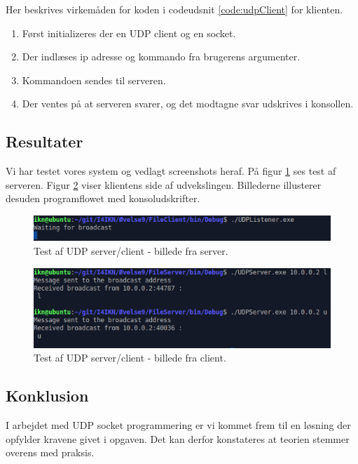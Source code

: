 Her beskrives virkemåden for koden i codeudsnit \ref{code:udpClient} for klienten.

\begin{enumerate}
	\item Først initializeres der en UDP client og en socket.
	\item Der indlæses ip adresse og kommando fra brugerens argumenter.
	\item Kommandoen sendes til serveren.
	\item Der ventes på at serveren svarer, og det modtagne svar udskrives i konsollen.
\end{enumerate}

\subsection{Resultater}
Vi har testet vores system og vedlagt screenshots heraf. På figur \ref{fig:udp_h1} ses test af serveren. Figur \ref{fig:udp_h2} viser klientens side af udvekslingen. Billederne illusterer desuden programflowet med konsoludskrifter.

\begin{figure}[H]
	\centering
	\includegraphics[width=0.9\linewidth]{figs/udp_h1}
	\caption{Test af UDP server/client - billede fra server.}
	\label{fig:udp_h1}
\end{figure}

\begin{figure}[H]
	\centering
	\includegraphics[width=0.9\linewidth]{figs/udp_h2}
	\caption{Test af UDP server/client - billede fra client.}
	\label{fig:udp_h2}
\end{figure}

\subsection{Konklusion}
I arbejdet med UDP socket programmering er vi kommet frem til en løsning der opfylder kravene givet i opgaven. Det kan derfor konstateres at teorien stemmer overens med praksis.
